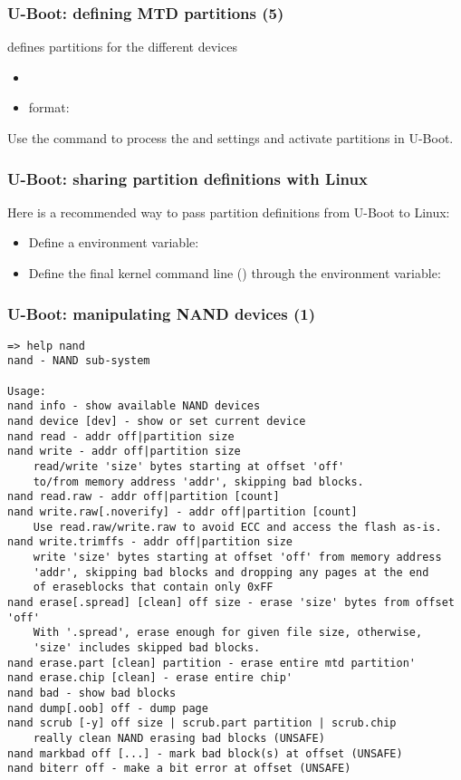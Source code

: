 \begin{frame}[fragile]
  \frametitle{U-Boot: defining MTD partitions (5)}
   defines partitions for the different devices\\
  \begin{itemize}
    \item {}
    \item {} format: 
  \end{itemize}
  Use the  command to process the  and
   settings and activate partitions in U-Boot.
\end{frame}

\begin{frame}
  \frametitle{U-Boot: sharing partition definitions with Linux}
  Here is a recommended way to pass partition definitions from U-Boot to Linux:
  \begin{itemize}
  \item Define a  environment variable:\\
  \item Define the final kernel command line ()
    through the  environment variable:
  \end{itemize}
\end{frame}

\begin{frame}[fragile]
  \frametitle{U-Boot: manipulating NAND devices (1)}
  \begin{block}{}
  \tiny
  \begin{verbatim}
=> help nand
nand - NAND sub-system

Usage:
nand info - show available NAND devices
nand device [dev] - show or set current device
nand read - addr off|partition size
nand write - addr off|partition size
    read/write 'size' bytes starting at offset 'off'
    to/from memory address 'addr', skipping bad blocks.
nand read.raw - addr off|partition [count]
nand write.raw[.noverify] - addr off|partition [count]
    Use read.raw/write.raw to avoid ECC and access the flash as-is.
nand write.trimffs - addr off|partition size
    write 'size' bytes starting at offset 'off' from memory address
    'addr', skipping bad blocks and dropping any pages at the end
    of eraseblocks that contain only 0xFF
nand erase[.spread] [clean] off size - erase 'size' bytes from offset 'off'
    With '.spread', erase enough for given file size, otherwise,
    'size' includes skipped bad blocks.
nand erase.part [clean] partition - erase entire mtd partition'
nand erase.chip [clean] - erase entire chip'
nand bad - show bad blocks
nand dump[.oob] off - dump page
nand scrub [-y] off size | scrub.part partition | scrub.chip
    really clean NAND erasing bad blocks (UNSAFE)
nand markbad off [...] - mark bad block(s) at offset (UNSAFE)
nand biterr off - make a bit error at offset (UNSAFE)
  \end{verbatim}
  \end{block}
\end{frame}


